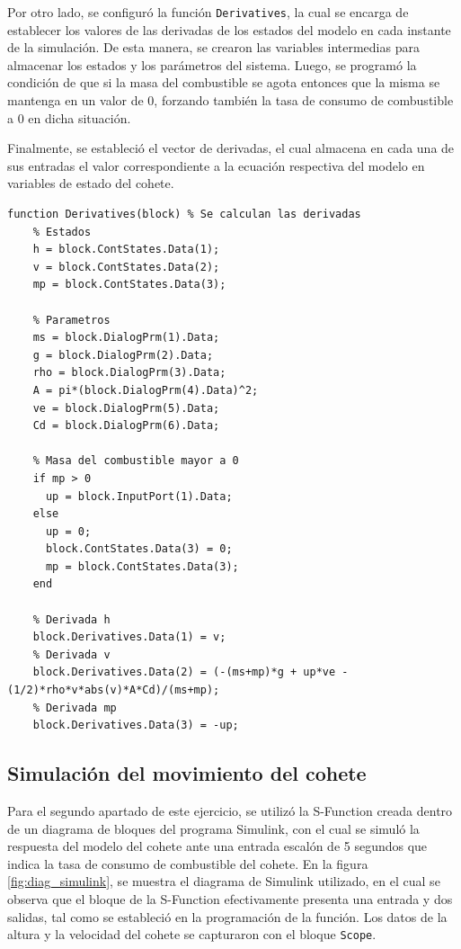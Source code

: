 \documentclass[12pt,letterpaper]{article}
\begin{document}
Por otro lado, se configuró la función \texttt{Derivatives}, la cual se encarga de establecer los
valores de las derivadas de los estados del modelo en cada instante de la simulación. De esta
manera, se crearon las variables intermedias para almacenar los estados y los parámetros
del sistema. Luego, se programó la condición de que si la masa del combustible se agota entonces que
la misma se mantenga en un valor de 0, forzando también la tasa de consumo de combustible a 0 en
dicha situación.

Finalmente, se estableció el vector de derivadas, el cual almacena en cada una de sus entradas el
valor correspondiente a la ecuación respectiva del modelo en variables de estado del cohete.

\begin{lstlisting}[style=Matlab-editor, basicstyle=\mlttfamily]
  function Derivatives(block) % Se calculan las derivadas
    % Estados
    h = block.ContStates.Data(1);
    v = block.ContStates.Data(2);
    mp = block.ContStates.Data(3);

    % Parametros
    ms = block.DialogPrm(1).Data;
    g = block.DialogPrm(2).Data;
    rho = block.DialogPrm(3).Data;
    A = pi*(block.DialogPrm(4).Data)^2;
    ve = block.DialogPrm(5).Data;
    Cd = block.DialogPrm(6).Data;

    % Masa del combustible mayor a 0
    if mp > 0
      up = block.InputPort(1).Data;
    else
      up = 0;
      block.ContStates.Data(3) = 0;
      mp = block.ContStates.Data(3);
    end

    % Derivada h
    block.Derivatives.Data(1) = v;
    % Derivada v
    block.Derivatives.Data(2) = (-(ms+mp)*g + up*ve -(1/2)*rho*v*abs(v)*A*Cd)/(ms+mp);
    % Derivada mp
    block.Derivatives.Data(3) = -up;     
\end{lstlisting}


\subsection{Simulación del movimiento del cohete}
Para el segundo apartado de este ejercicio, se utilizó la S-Function creada dentro de un diagrama de
bloques del programa Simulink, con el cual se simuló la respuesta del modelo del cohete ante una
entrada escalón de 5 segundos que indica la tasa de consumo de combustible del cohete. En la figura
\ref{fig:diag_simulink}, se muestra el diagrama de Simulink utilizado, en el cual se observa que el
bloque de la S-Function efectivamente presenta una entrada y dos salidas, tal como se estableció en
la programación de la función. Los datos de la altura y la velocidad del cohete se capturaron con el
bloque \texttt{Scope}.
\end{document}
